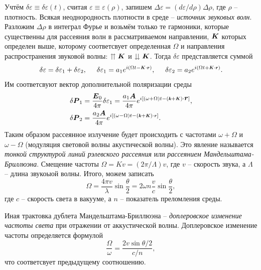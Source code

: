 Учтём $\delta \varepsilon \equiv \delta \varepsilon(t)$, считая $\varepsilon \equiv \varepsilon(\rho)$, запишем $\Delta \varepsilon = (d\varepsilon/d \rho) \Delta \rho$, где $\rho$ -- плотность.  Всякая неоднородность плотности в среде -- \textit{источник звуковых волн}. Разложим $\Delta \rho$ в интеграл Фурье и возьмём только те гармоники, которые существенны для рассеяния волн в рассматриваемом направлении, $\mbox{\boldmath $K$}$ которых определен выше, которому соответсвует определенная $\Omega$ и направления распространения звуковой волны: $\upuparrows \mbox{\boldmath $K$}$ и $\downdownarrows \mbox{\boldmath $K$}$. Тогда $\delta \varepsilon$ представляется суммой
\begin{equation*}
    \delta \varepsilon = \delta \varepsilon_1 + \delta \varepsilon_2,
    \hspace{5 mm} 
    \delta \varepsilon_1 = a_1 e^{i(\Omega t - \smallvc{K} \cdot \smallvc{r})},
    \hspace{5 mm} 
    \delta \varepsilon_2 = a_2 e^{i(\Omega t + \smallvc{K} \cdot \smallvc{r})}.
\end{equation*}
Им соответсвуют вектор дополнительной поляризации среды
\begin{align*}
    \delta \vc{P}_1 &= \frac{\vc{E}_0}{4 \pi} \delta \varepsilon_1 = \frac{a_1 \vc{A}}{4 \pi} e^{i[(\omega + \Omega)t - (\smallvc{k}+\smallvc{K})\cdot \vc{r}]}, \\
    \delta \vc{P}_2 &= \frac{a_2 \vc{A}}{4 \pi} e^{i[(\omega-\Omega)t - (\smallvc{k}+\smallvc{K})\cdot \smallvc{r}]}.
\end{align*}
Таким образом рассеянное излучение будет происходить с частотами $\omega + \Omega$ и $\omega - \Omega$ (модуляция световой волны акустической волны). Это явление называется \textit{тонкой структурой линий рэлевского рассеяния} или \textit{рассеянием Мандельштама-Бриллюэна}. Смещение частоты $\Omega = K v = (2\pi/\Lambda) v$, где $v$ -- скорость звука, а $\Lambda$ -- длина звукоыой волны. Итого, можем записать
\begin{equation*}
    \Omega = \frac{4 \pi v}{\lambda} \sin \frac{\theta}{2} = 2 \omega n \frac{v}{c} \sin \frac{\theta}{2},
\end{equation*}
где $c$ -- скорость света в вакууме, а $n$ -- показатель преломления среды. 



Иная трактовка дублета Мандельштама-Бриллюэна -- \textit{доплеровское изменение частоты света} при отражении от аккустической волны. Доплеровское изменение частоты определяется формулой
\begin{equation*}
    \frac{\Omega}{\omega} = \frac{2 v \sin \theta/2}{c/n},
\end{equation*}
что соответсвует предыдущему соотношению. 



